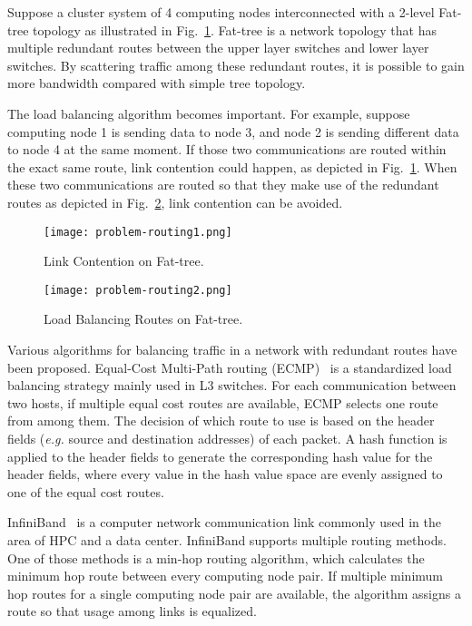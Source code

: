Suppose a cluster system of 4 computing nodes interconnected with a
2-level Fat-tree topology as illustrated in Fig.~\ref{fig-problem-routing1}.
Fat-tree is a network topology that has multiple redundant routes between the
upper layer switches and lower layer switches. By scattering traffic among
these redundant routes, it is possible to gain more bandwidth compared with
simple tree topology.

The load balancing algorithm becomes important. For example, suppose
computing node 1 is sending data to node 3, and node 2 is sending
different data to node 4 at the same moment. If those two communications
are routed within the exact same route, link contention could happen, as
depicted in Fig.~\ref{fig-problem-routing1}. When these two
communications are routed so that they make use of the redundant routes
as depicted in Fig.~\ref{fig-problem-routing2}, link contention can be
avoided.

\begin{figure}[htbp]
    \centering
    \texttt{[image: problem-routing1.png]}
    \caption{Link Contention on Fat-tree.}%
    \label{fig-problem-routing1}
\end{figure}

\begin{figure}[htbp]
    \centering
    \texttt{[image: problem-routing2.png]}
    \caption{Load Balancing Routes on Fat-tree.}%
    \label{fig-problem-routing2}
\end{figure}

Various algorithms for balancing traffic in a network with redundant
routes have been proposed. Equal-Cost Multi-Path routing (ECMP)~\autocite{ecmp} is
a standardized load balancing strategy mainly used in L3 switches. For each
communication between two hosts, if multiple equal cost routes are available,
ECMP selects one route from among them. The decision of which route to use is
based on the header fields (\emph{e.g.} source and destination addresses) of
each packet. A hash function is applied to the header fields to generate the
corresponding hash value for the header fields, where every value in the hash
value space are evenly assigned to one of the equal cost routes.

InfiniBand~\autocite{infiniband} is a computer network communication link
commonly used in the area of HPC and a data center. InfiniBand supports
multiple routing methods. One of those methods is a min-hop routing
algorithm, which calculates the minimum hop route between every
computing node pair. If multiple minimum hop routes for a single
computing node pair are available, the algorithm assigns a route so that
usage among links is equalized.

